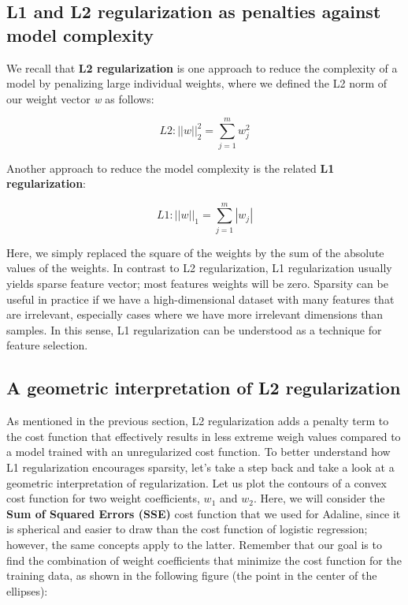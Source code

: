 \documentclass[11pt]{article}
\begin{document}
    \subsection{L1 and L2 regularization as penalties against model
complexity}\label{l1-and-l2-regularization-as-penalties-against-model-complexity}

    We recall that \textbf{L2 regularization} is one approach to reduce the
complexity of a model by penalizing large individual weights, where we
defined the L2 norm of our weight vector \emph{w} as follows:

\[L2: ||w||^2_2 = \sum^{m}_{j=1}w^2_j\]

Another approach to reduce the model complexity is the related
\textbf{L1 regularization}:

\[L1: ||w||_1 = \sum^{m}_{j=1}|w_j|\]

Here, we simply replaced the square of the weights by the sum of the
absolute values of the weights. In contrast to L2 regularization, L1
regularization usually yields sparse feature vector; most features
weights will be zero. Sparsity can be useful in practice if we have a
high-dimensional dataset with many features that are irrelevant,
especially cases where we have more irrelevant dimensions than samples.
In this sense, L1 regularization can be understood as a technique for
feature selection.

    \subsection{A geometric interpretation of L2
regularization}\label{a-geometric-interpretation-of-l2-regularization}

    As mentioned in the previous section, L2 regularization adds a penalty
term to the cost function that effectively results in less extreme weigh
values compared to a model trained with an unregularized cost function.
To better understand how L1 regularization encourages sparsity, let's
take a step back and take a look at a geometric interpretation of
regularization. Let us plot the contours of a convex cost function for
two weight coefficients, \(w_1\) and \(w_2\). Here, we will consider the
\textbf{Sum of Squared Errors (SSE)} cost function that we used for
Adaline, since it is spherical and easier to draw than the cost function
of logistic regression; however, the same concepts apply to the latter.
Remember that our goal is to find the combination of weight coefficients
that minimize the cost function for the training data, as shown in the
following figure (the point in the center of the ellipses):
\end{document}
